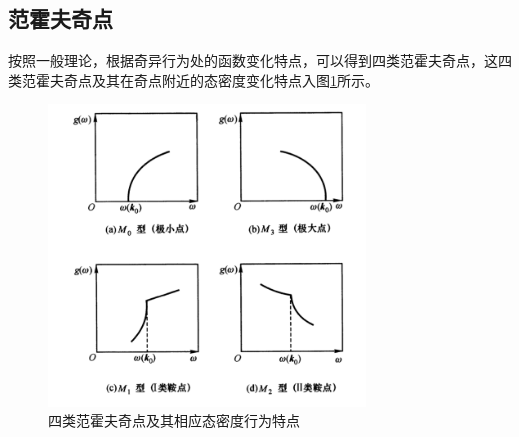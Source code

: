 \subsection{范霍夫奇点}
按照一般理论，根据奇异行为处的函数变化特点，可以得到四类范霍夫奇点，这四类范霍夫奇点及其在奇点附近的态密度变化特点入图\ref{fig:fanhuofu}所示。\par
\begin{figure}
\begin{center}
\includegraphics[height=8cm]{figures/fanhuofu.png}
\caption{四类范霍夫奇点及其相应态密度行为特点}
\label{fig:fanhuofu}
\end{center}
\end{figure}
